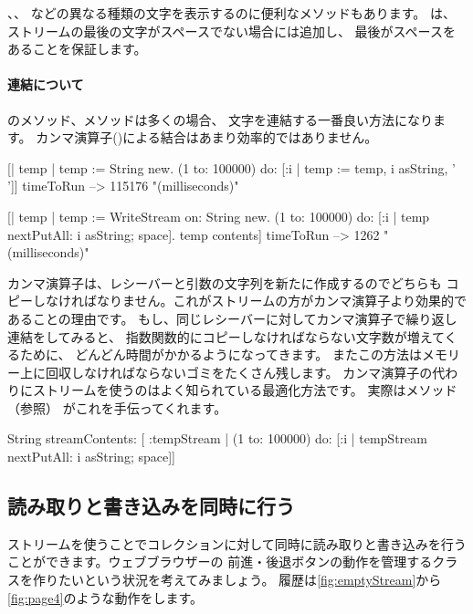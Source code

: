\documentclass[a4paper,10pt,twoside]{book}
\begin{document}
、、 
などの異なる種類の文字を表示するのに便利なメソッドもあります。
は、ストリームの最後の文字がスペースでない場合には追加し、
最後がスペースをあることを保証します。

\paragraph{連結について}

のメソッド、メソッドは多くの場合、
文字を連結する一番良い方法になります。
カンマ演算子(\ct{,})による結合はあまり効率的ではありません。


\begin{code}{}
[| temp |
  temp := String new.
  (1 to: 100000)
    do: [:i | temp := temp, i asString, ' ']] timeToRun --> 115176 "(milliseconds)"

[| temp |
  temp := WriteStream on: String new.
  (1 to: 100000)
    do: [:i | temp nextPutAll: i asString; space].
  temp contents] timeToRun --> 1262 "(milliseconds)"
\end{code}

カンマ演算子は、レシーバーと引数の文字列を新たに作成するのでどちらも
コピーしなければなりません。これがストリームの方がカンマ演算子より効果的であることの理由です。
もし、同じレシーバーに対してカンマ演算子で繰り返し連結をしてみると、
指数関数的にコピーしなければならない文字数が増えてくるために、
どんどん時間がかかるようになってきます。
またこの方法はメモリー上に回収しなければならないゴミをたくさん残します。
カンマ演算子の代わりにストリームを使うのはよく知られている最適化方法です。
実際はメソッド（\pageref{sec:streamContents}参照）
がこれを手伝ってくれます。


\begin{code}{}
String streamContents: [ :tempStream |
  (1 to: 100000)
       do: [:i | tempStream nextPutAll: i asString; space]] 
\end{code}

\subsection{読み取りと書き込みを同時に行う}

ストリームを使うことでコレクションに対して同時に読み取りと書き込みを行うことができます。ウェブブラウザーの
前進・後退ボタンの動作を管理するクラスを作りたいという状況を考えてみましょう。
履歴は\ref{fig:emptyStream}から\ref{fig:page4}のような動作をします。
\end{document}
